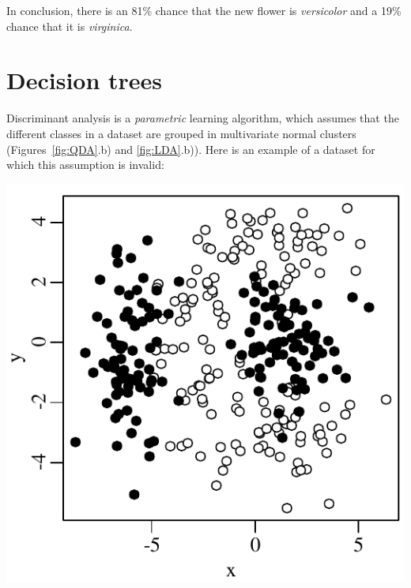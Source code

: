 In conclusion, there is an 81\% chance that the new flower is
\emph{versicolor} and a 19\% chance that it is \emph{virginica}.

\section{Decision trees}
\label{sec:CART}

Discriminant analysis is a \textit{parametric} learning algorithm,
which assumes that the different classes in a dataset are grouped in
multivariate normal clusters (Figures~\ref{fig:QDA}.b) and
\ref{fig:LDA}.b)). Here is an example of a dataset for which this
assumption is invalid:

\noindent\begin{minipage}[t][][b]{.35\textwidth}
\includegraphics[width=\textwidth]{../figures/CARTdata.pdf}\\
\end{minipage}
\begin{minipage}[t][][t]{.65\textwidth}
  \label{fig:CARTdata}
\end{minipage}

